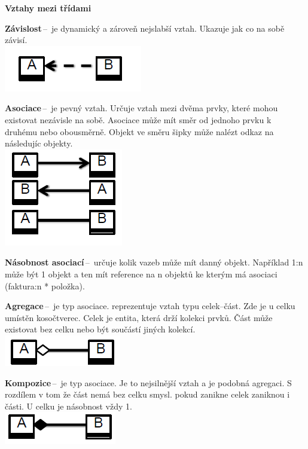 \begin{Large}\vspace{0,5cm} \textbf{Vztahy mezi třídami}
\end{Large}

\textbf{Závislost}\,--\, je dynamický a zároveň nejslabší vztah. Ukazuje jak co na sobě závisí.\\
\includegraphics[scale=1]{BPC-TIN/images/zavislost.PNG}

\textbf{Asociace}\,--\, je pevný vztah. Určuje vztah mezi dvěma prvky, které mohou existovat nezávisle na sobě. Asociace může mít směr od jednoho prvku k druhému nebo obousměrně. Objekt ve směru šipky může nalézt odkaz na následujíc objekty. \\
\includegraphics[scale=1]{BPC-TIN/images/asociace.PNG}

\textbf{Násobnost asociací}\,--\, určuje kolik vazeb může mít danný objekt. Například 1:n může být 1 objekt a ten mít reference na n objektů ke kterým má asociaci (faktura:n * položka).

\textbf{Agregace}\,--\, je typ asociace. reprezentuje vztah typu celek--část. Zde je u celku umístěn kosočtverec. Celek je entita, která drží kolekci prvků. Část může existovat bez celku nebo být součástí jiných kolekcí. \\\includegraphics[scale=1]{BPC-TIN/images/agregace.PNG}

\textbf{Kompozice}\,--\, je typ asociace. Je to nejsilnější vztah a je podobná agregaci. S rozdílem v tom že část nemá bez celku smysl. pokud zanikne celek zaniknou i části. U celku je násobnost vždy 1.\\ \includegraphics[scale=1]{BPC-TIN/images/kompozice.PNG}

